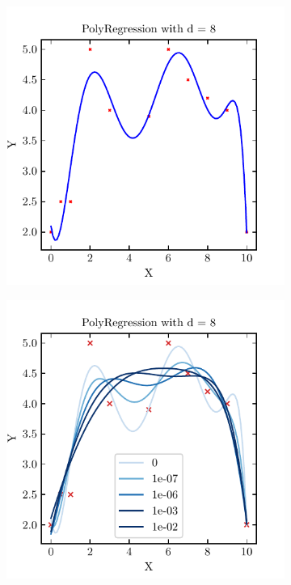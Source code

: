 \documentclass{article}
\begin{document}
\begin{figure}[h]
        \begin{subfigure}{0.48\linewidth}
                \centering
                \includegraphics[width=\linewidth]{A4.1.pdf}
        \end{subfigure}
        \hfill
        \begin{subfigure}{0.48\linewidth}
                \centering
                \includegraphics[width=\linewidth]{A4.2.pdf}
        \end{subfigure}
\end{figure}
\end{document}
